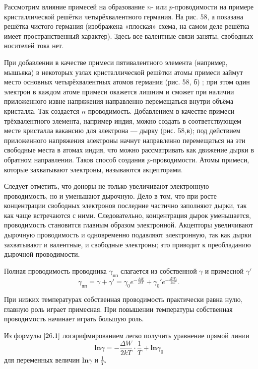 \documentclass[a4paper,10pt]{book}
\begin{document}
Рассмотрим влияние примесей на образование $n$- или $p$-проводимости на примере кристаллической решётки четырёхвалентного германия. На рис. 58, $\textit{а}$ показана решётка чистого германия (изображена «плоская» схема, на самом деле решётка имеет пространственный характер). Здесь все валентные связи заняты, свободных носителей тока нет.

При добавлении в качестве примеси пятивалентного элемента (например, мышьяка) в некоторых узлах кристаллической решётки атомы примеси займут место основных четырёхвалентных атомов германия (рис. 58, $\textit{б}$) ; при этом один электрон в каждом атоме примеси окажется лишним и сможет при наличии приложенного извне напряжения направленно перемещаться внутри объёма кристалла. Так создается $n$-проводимость. Добавлением в качестве примеси трёхвалентного элемента, например индия, можно создать в соответствующем месте кристалла вакансию для электрона — дырку (рис. 58,$\textit{в}$); под действием приложенного напряжения электроны начнут направленно перемещаться на эти свободные места в атомах индия, что можно рассматривать как движение дырки в обратном направлении. Таков способ создания $p$-проводимости. Атомы примеси, которые захватывают электроны, называются акцепторами.

Следует отметить, что доноры не только увеличивают электронную проводимость, но и уменьшают дырочную. Дело в том, что при росте концентрации свободных электронов последние частично заполняют дырки, так как чаще встречаются с ними. Следовательно, концентрация дырок уменьшается, проводимость становится главным образом электронной. Акцепторы увеличивают дырочную проводимость и одновременно подавляют электронную, так как дырки захватывают и валентные, и свободные электроны; это приводит к преобладанию дырочной проводимости.

Полная проводимость проводника $\gamma_{\text{пп}}$ слагается из собственной $\gamma$ и примесной $\gamma'$\begin{equation}\label{26.5}
\gamma_{\text{пп}} = \gamma + \gamma' = \gamma_0 e^{-\frac{\Delta W}{2kT}} + \gamma_0' e^{-\frac{\Delta W_1}{2kT}}.
\end{equation}

При низких температурах собственная проводимость практически равна нулю, главную роль играет примесная. При повышении температуры собственная проводимость начинает играть большую роль.

Из формулы $\ref{26.1}$ логарифмированием легко получить уравнение прямой линии 
\begin{equation*}
\mathbf{ln}\gamma = - \frac{\Delta W}{2kT} \cdot \frac{1}{T} + \mathbf{ln}\gamma_0
\end{equation*}для переменных величин $\mathbf{ln}\gamma$ и $\frac{1}{T}$.
\end{document}
